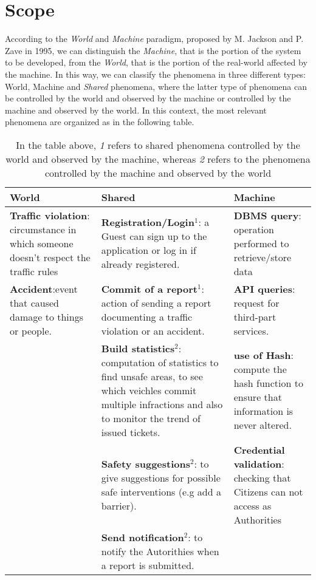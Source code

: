 \documentclass{report}
\begin{document}
\section{Scope}
According to the \textit{World} and \textit{Machine} paradigm, proposed by M. Jackson and P. Zave in 1995, we can distinguish the \textit{Machine}, that is the portion of the system to be developed, from the \textit{World}, that is the portion of the real-world affected by the machine. In this way, we can classify the phenomena in three different types: World, Machine and \textit{Shared} phenomena, where the latter type of phenomena can be controlled by the world and observed by the machine or controlled by the machine and observed by the world.
\newline
In this context, the most relevant phenomena are organized as in the following table.
\begin{table}[!ht]
		\begin{center}
		\begin{tabular}{|C{3.5cm}||C{3.5cm}||C{3.5cm}|}
			\toprule
			\textbf{World} &\textbf{Shared}& \textbf{Machine}\\
			\midrule
			\textbf{Traffic violation}: circumstance in which someone doesn't respect the traffic rules&\textbf{Registration/Login}$^{1}$: a Guest can sign up to the application or log in if already registered.&\textbf{DBMS query}: operation performed to retrieve/store data\\
			\midrule
			\textbf{Accident}:event that caused damage to things or people.&\textbf{Commit of a report}$^{1}$: action of sending a report documenting a traffic violation or an accident.&\textbf{API queries}: request for third-part services.\\
			\midrule
			&\textbf{Build statistics}$^{2}$: computation of statistics to find unsafe areas, to see which veichles commit multiple infractions and also to monitor the trend of issued tickets.&\textbf{use of Hash}: compute the hash function to ensure that information is never altered.\\
			\midrule
			&\textbf{Safety suggestions}$^{2}$: to give suggestions for possible safe interventions (e.g add a barrier).&\textbf{Credential validation}: checking that Citizens can not access as Authorities\\ 
			\midrule
			\midrule
			&\textbf{Send notification}$^{2}$: to notify the Autorithies when a report is submitted.&\\
			\bottomrule
		\end{tabular}
		\end{center}
		\caption{In the table above, \textit{1} refers to shared phenomena controlled by the world and observed by the machine, whereas \textit{2} refers to the phenomena controlled by the machine and observed by the world}
		\label{tab:multicol}
	\end{table}
	
\end{document}
